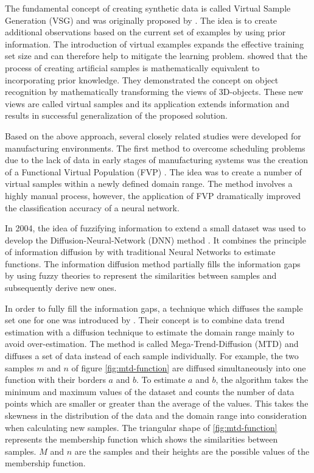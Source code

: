 \documentclass[parskip=full]{scrartcl}
\begin{document}
The fundamental concept of creating synthetic data is called Virtual Sample
Generation (VSG) and was originally proposed by \cite{Niyogi.1998}. The idea is
to create additional observations based on the current set of examples by using
prior information. The introduction of virtual examples expands the effective
training set size and can therefore help to mitigate the learning problem.
\cite{Niyogi.1998} showed that the process of creating artificial samples is
mathematically equivalent to incorporating prior knowledge. They demonstrated
the concept on object recognition by mathematically transforming the views of
3D-objects. These new views are called virtual samples and its application
extends information and results in successful generalization of the proposed
solution.

Based on the above approach, several closely related studies were developed for
manufacturing environments. The first method to overcome scheduling problems due
to the lack of data in early stages of manufacturing systems was the creation of
a Functional Virtual Population (FVP) \cite{Li.2003}. The idea was to create a
number of virtual samples within a newly defined domain range. The method
involves a highly manual process, however, the application of FVP dramatically
improved the classification accuracy of a neural network. 

In 2004, the idea of fuzzifying information to extend a small dataset was used
to develop the Diffusion-Neural-Network (DNN) method \cite{Huang.2004}. It
combines the principle of information diffusion by \cite{Huang.1997} with
traditional Neural Networks to estimate functions. The information diffusion
method partially fills the information gaps by using fuzzy theories to represent
the similarities between samples and subsequently derive new ones. 

In order to fully fill the information gaps, a technique which diffuses the
sample set one for one was introduced by \cite{Li.2007}. Their concept is to
combine data trend estimation with a diffusion technique to estimate the domain
range mainly to avoid over-estimation. The method is called Mega-Trend-Diffusion
(MTD) and diffuses a set of data instead of each sample individually. For
example, the two samples $\mathit{m}$ and $\mathit{n}$ of figure
\ref{fig:mtd-function} are diffused simultaneously into one function with their
borders $\mathit{a}$ and $\mathit{b}$. To estimate $\mathit{a}$ and
$\mathit{b}$, the algorithm takes the minimum and maximum values of the dataset
and counts the number of data points which are smaller or greater than the
average of the values. This takes the skewness in the distribution of the data
and the domain range into consideration when calculating new samples. The
triangular shape of \ref{fig:mtd-function} represents the membership function
which shows the similarities between samples. $\mathit{M}$ and $\mathit{n}$ are
the samples and their heights are the possible values of the membership
function.
\end{document}
